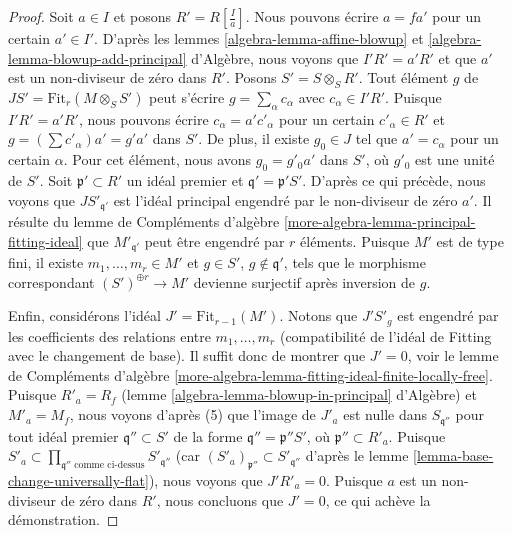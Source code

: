 \begin{proof}
\medskip\noindent
Soit $a \in I$ et posons $R' = R[\frac{I}{a}]$. Nous pouvons écrire $a = fa'$
pour un certain $a' \in I'$. D'après les lemmes \ref{algebra-lemma-affine-blowup} et
\ref{algebra-lemma-blowup-add-principal} d'Algèbre, nous voyons que $I' R' = a'R'$
et que $a'$ est un non-diviseur de zéro dans $R'$. Posons $S' = S \otimes_S R'$.
Tout élément $g$ de $JS' = \text{Fit}_r(M \otimes_S S')$ peut
s'écrire $g = \sum_\alpha c_\alpha$ avec $c_\alpha \in I'R'$.
Puisque $I'R' = a'R'$, nous pouvons écrire $c_\alpha = a'c'_\alpha$ pour un certain
$c'_\alpha \in R'$ et $g = (\sum c'_\alpha)a' = g' a'$ dans $S'$.
De plus, il existe $g_0 \in J$ tel que $a' = c_\alpha$
pour un certain $\alpha$. Pour cet élément, nous avons $g_0 = g'_0 a'$ dans $S'$,
où $g'_0$ est une unité de $S'$.
Soit $\mathfrak p' \subset R'$
un idéal premier et $\mathfrak q' = \mathfrak p'S'$.
D'après ce qui précède, nous voyons que $JS'_{\mathfrak q'}$ est l'idéal
principal engendré par le non-diviseur de zéro $a'$.
Il résulte du lemme de Compléments d'algèbre
\ref{more-algebra-lemma-principal-fitting-ideal}
que $M'_{\mathfrak q'}$ peut être engendré par $r$ éléments.
Puisque $M'$ est de type fini, il existe $m_1, \ldots, m_r \in M'$ et
$g \in S'$, $g \not \in \mathfrak q'$, tels que le morphisme correspondant
$(S')^{\oplus r} \to M'$ devienne surjectif après inversion de $g$.

\medskip\noindent
Enfin, considérons l'idéal $J' = \text{Fit}_{r - 1}(M')$.
Notons que $J'S'_g$ est engendré par les coefficients des relations entre
$m_1, \ldots, m_r$ (compatibilité de l'idéal de Fitting avec le changement de base).
Il suffit donc de montrer que $J' = 0$, voir le
lemme de Compléments d'algèbre
\ref{more-algebra-lemma-fitting-ideal-finite-locally-free}.
Puisque $R'_a = R_f$ (lemme \ref{algebra-lemma-blowup-in-principal} d'Algèbre)
et $M'_a = M_f$, nous voyons d'après (5)
que l'image de $J'_a$ est nulle dans $S_{\mathfrak q''}$ pour tout idéal premier
$\mathfrak q'' \subset S'$ de la forme $\mathfrak q'' = \mathfrak p''S'$,
où $\mathfrak p'' \subset R'_a$. Puisque
$S'_a \subset \prod_{\mathfrak q''\text{ comme ci-dessus}} S'_{\mathfrak q''}$
(car $(S'_a)_{\mathfrak p''} \subset S'_{\mathfrak q''}$ d'après le
lemme \ref{lemma-base-change-universally-flat}),
nous voyons que $J'R'_a = 0$. Puisque $a$ est un non-diviseur de zéro dans $R'$, nous
concluons que $J' = 0$, ce qui achève la démonstration.
\end{proof}

